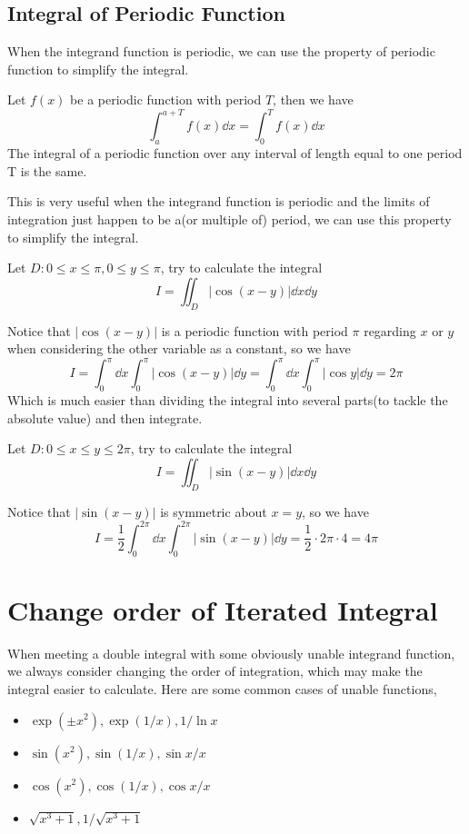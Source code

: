 \documentclass[a4]{overview}
\begin{document}
\subsection{Integral of Periodic Function}

When the integrand function is periodic, we can use the property of periodic function to simplify the integral.
\begin{lemma}
	Let $f(x)$ be a periodic function with period $T$, then we have
	\[
		\int_a^{a+T} f(x) \dd x = \int_0^T f(x) \dd x
	\]
	The integral of a periodic function over any interval of length equal to one period T is the same.
\end{lemma}

This is very useful when the integrand function is periodic and the limits of integration
just happen to be a(or multiple of) period, we can use this property to simplify the integral.

\begin{example}
	Let $D:0 \leq x \leq \pi, 0 \leq y \leq \pi$, try to calculate the integral
	\[
	I = \iint_D |\cos(x-y)| \dd x \dd y
	\] 
	\begin{answer}
		Notice that $|\cos(x-y)|$ is a periodic function with period $\pi$ regarding
		$x$ or $y$ when considering the other variable as a constant, so we have
		\[
			I = \int_0^{\pi} \dd x \int_0^{\pi} |\cos(x-y)| \dd y
			= \int_0^{\pi} \dd x \int_0^{\pi} |\cos y| \dd y
			= 2\pi
		\] 
		Which is much easier than dividing the integral into several parts(to tackle the
		absolute value) and then integrate.
	\end{answer}
\end{example}

\begin{example}
	Let $D:0 \leq x \leq y \leq 2\pi$, try to calculate the integral
	\[
	I = \iint_D |\sin(x-y)| \dd x \dd y
	\] 
	\begin{answer}
		Notice that $|\sin(x-y)|$ is symmetric about $x=y$, so we have
		\[
			I = \frac{1}{2} \int_0^{2\pi} \dd x \int_0^{2\pi} |\sin(x-y)| \dd y
			= \frac{1}{2}\cdot 2\pi\cdot 4 = 4\pi
		\] 
		
	\end{answer}	
\end{example}

\section{Change order of Iterated Integral}

When meeting a double integral with some obviously unable integrand function,
we always consider changing the order of integration, which may make the integral easier to calculate.
Here are some common cases of unable functions,
\begin{itemize}
	\item $\exp(\pm x^2), \exp(1 / x), 1 / \ln x$
	\item $\sin(x^2), \sin(1 / x), \sin x / x$
	\item $\cos(x^2), \cos(1 / x), \cos x / x$
	\item $\sqrt{x^{3}+1}, 1 / \sqrt{x^{3}+1}$
\end{itemize}
\end{document}
